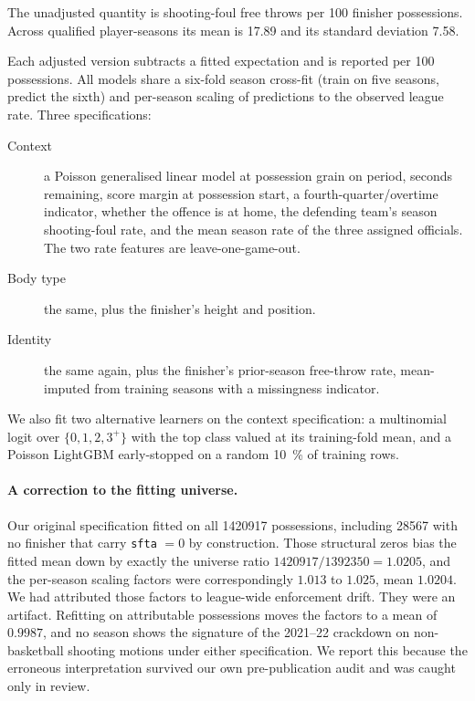 \documentclass[11pt,letterpaper]{article}
\begin{document}
The unadjusted quantity is shooting-foul free throws per 100 finisher
possessions. Across qualified player-seasons its mean is 17.89 and its standard
deviation 7.58.

Each adjusted version subtracts a fitted expectation and is reported per 100
possessions. All models share a six-fold season cross-fit (train on five seasons,
predict the sixth) and per-season scaling of predictions to the observed league
rate. Three specifications:

\begin{description}
\item[Context] a Poisson generalised linear model \citep{nelder1972generalized}
at possession grain on period, seconds remaining, score margin at possession
start, a fourth-quarter/overtime indicator, whether the offence is at home, the
defending team's season shooting-foul rate, and the mean season rate of the three
assigned officials. The two rate features are leave-one-game-out.
\item[Body type] the same, plus the finisher's height and position.
\item[Identity] the same again, plus the finisher's prior-season free-throw
rate, mean-imputed from training seasons with a missingness indicator.
\end{description}

We also fit two alternative learners on the context specification: a multinomial
logit over $\{0,1,2,3^{+}\}$ with the top class valued at its training-fold mean,
and a Poisson LightGBM \citep{ke2017lightgbm} early-stopped on a random
\SI{10}{\percent} of training rows.

\paragraph{A correction to the fitting universe.}
Our original specification fitted on all \num{1420917} possessions, including
\num{28567} with no finisher that carry \texttt{sfta} $= 0$ by construction.
Those structural zeros bias the fitted mean down by exactly the universe ratio
$\num{1420917}/\num{1392350} = 1.0205$, and the per-season scaling factors were
correspondingly $1.013$ to $1.025$, mean $1.0204$. We had attributed those
factors to league-wide enforcement drift. They were an artifact. Refitting on
attributable possessions moves the factors to a mean of $0.9987$, and no season
shows the signature of the 2021--22 crackdown on non-basketball shooting motions
under either specification. We report this because the erroneous interpretation
survived our own pre-publication audit and was caught only in review.
\end{document}
